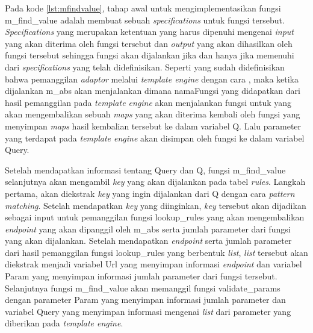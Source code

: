 Pada kode \ref{lst:mfindvalue}, tahap awal untuk mengimplementasikan fungsi m\_find\_value adalah membuat sebuah \textit{specifications} untuk fungsi tersebut. \textit{Specifications} yang merupakan ketentuan yang harus dipenuhi mengenai \textit{input} yang akan diterima oleh fungsi tersebut dan \textit{output} yang akan dihasilkan oleh fungsi tersebut sehingga fungsi akan dijalankan jika dan hanya jika memenuhi dari \textit{specifications} yang telah didefinisikan. Seperti yang sudah didefinisikan bahwa pemanggilan \textit{adaptor} melalui \textit{template engine} dengan cara , maka ketika dijalankan m\_abs akan menjalankan  dimana namaFungsi yang didapatkan dari hasil pemanggilan pada \textit{template engine} akan menjalankan fungsi  untuk yang akan mengembalikan sebuah \textit{maps} yang akan diterima kembali oleh fungsi  yang menyimpan \textit{maps} hasil kembalian tersebut ke dalam variabel Q. Lalu parameter yang terdapat pada \textit{template engine} akan disimpan oleh fungsi  ke dalam variabel Query.

Setelah mendapatkan informasi tentang Query dan Q, fungsi m\_find\_value selanjutnya akan mengambil \textit{key} yang akan dijalankan pada tabel \textit{rules}. Langkah pertama, akan diekstrak \textit{key} yang ingin dijalankan dari Q dengan cara \textit{pattern matching}. Setelah mendapatkan \textit{key} yang diinginkan, \textit{key} tersebut akan dijadikan sebagai input untuk pemanggilan fungsi lookup\_rules yang akan mengembalikan \textit{endpoint} yang akan dipanggil oleh m\_abs serta jumlah parameter dari fungsi yang akan dijalankan. Setelah mendapatkan \textit{endpoint} serta jumlah parameter dari hasil pemanggilan fungsi lookup\_rules yang berbentuk \textit{list}, \textit{list} tersebut akan diekstrak menjadi variabel Url yang menyimpan informasi \textit{endpoint} dan variabel Param yang menyimpan informasi jumlah parameter dari fungsi tersebut. Selanjutnya fungsi m\_find\_value akan memanggil fungsi validate\_params dengan parameter Param yang menyimpan informasi jumlah parameter dan variabel Query yang menyimpan informasi mengenai \textit{list} dari parameter yang diberikan pada \textit{template engine}.

